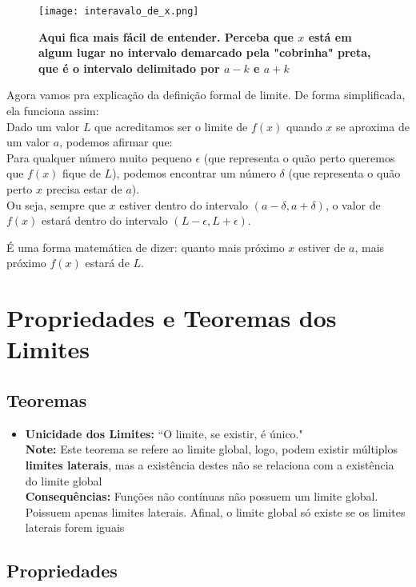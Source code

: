 \documentclass{article}
\begin{document}
\begin{figure}[h]
    \centering
    \texttt{[image: interavalo\_de\_x.png]}
    \caption{\textbf{Aqui fica mais fácil de entender. Perceba que $x$ está em algum lugar no intervalo demarcado pela "cobrinha" preta, que é o intervalo delimitado por $a - k$ e $a + k$}}
\end{figure}
\noindent Agora vamos pra explicação da definição formal de limite. De forma simplificada, ela funciona assim:
\\[10pt]
Dado um valor \(L\) que acreditamos ser o limite de \(f(x)\) quando \(x\) se aproxima de um valor \(a\), podemos afirmar que:
\\[10pt]
Para qualquer número muito pequeno \(\epsilon\) (que representa o quão perto queremos que \(f(x)\) fique de \(L\)), podemos encontrar um número \(\delta\) (que representa o quão perto \(x\) precisa estar de \(a\)).
\\[10pt]
Ou seja, sempre que \(x\) estiver dentro do intervalo \((a - \delta, a + \delta)\), o valor de \(f(x)\) estará dentro do intervalo \((L - \epsilon, L + \epsilon)\).

É uma forma matemática de dizer: quanto mais próximo \(x\) estiver de \(a\), mais próximo \(f(x)\) estará de \(L\).

\section{Propriedades e Teoremas dos Limites}

\subsection{Teoremas}

\begin{itemize}
\item \textbf{Unicidade dos Limites:} ``O limite, se existir, é único."\\
\textbf{Note:} Este teorema se refere ao limite global, logo, podem existir múltiplos \textbf{limites laterais}, mas a existência destes não se relaciona com a existência do limite global\\[10pt]
\textbf{Consequências:} Funções não contínuas não possuem um limite global. Poissuem apenas limites laterais. Afinal, o limite global só existe se os limites laterais forem iguais

\end{itemize}

\subsection{Propriedades}
\end{document}

